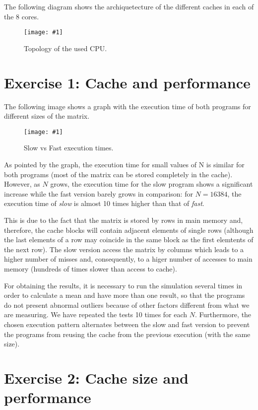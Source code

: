 \documentclass{article}
\newcommand{\myFigure}[4]{%
    \begin{figure}[!ht]
        \texttt{[image: \#1]}
        \centering
        \caption{#2}
        \label{#3}
    \end{figure}
}
\begin{document}
\pagebreak

The following diagram shows the archiquetecture of the different caches in each of the 8 cores. 

\myFigure{../material_P3/out0/mv/figure.png}{Topology of the used CPU.}
{topology}{0.63}

\pagebreak

\section*{Exercise 1: Cache and performance}

The following image shows a graph with the execution time of both programs for different sizes of the matrix.

\myFigure{../material_P3/out1/mv_att4/slow_fast_time.png}{Slow vs Fast execution times.}{slow_fast_times}{0.65}

As pointed by the graph, the execution time for small values of N is similar for both programs (most of the matrix can be stored completely in the cache). However, as $N$ grows, the execution time for the slow program shows a significant increase while the fast version barely grows in comparison: for $N=16384$, the execution time of \emph{slow} is almost 10 times higher than that of \emph{fast}.

This is due to the fact that the matrix is stored by rows in main memory and, therefore, the cache blocks will contain adjacent elements of single rows (although the last elements of a row may coincide in the same block as the first elemtents of the next row). The slow version access the matrix by columns which leads to a higher number of misses and, consequently, to a higer number of accesses to main memory (hundreds of times slower than access to cache). 

For obtaining the results, it is necessary to run the simulation several times in order to calculate a mean and have more than one result, so that the programs do not present abnormal outliers because of other factors different from what we are measuring. We have repeated the tests 10 times for each $N$. Furthermore, the chosen execution pattern alternates between the slow and fast version to prevent the programs from reusing the cache from the previous execution (with the same size).

\pagebreak

\section*{Exercise 2: Cache size and performance}
\end{document}
